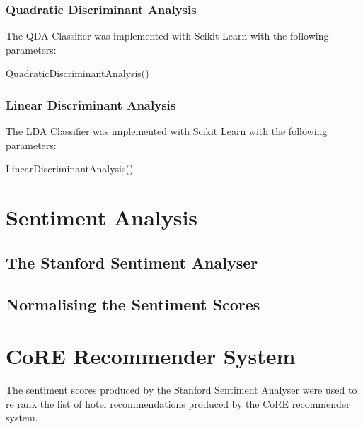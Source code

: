 \subsubsection*{Quadratic Discriminant Analysis}

The QDA Classifier was implemented with Scikit Learn with the following parameters:

\begin{tcolorbox}
\begin{center}
	QuadraticDiscriminantAnalysis()
\end{center}
\end{tcolorbox}

\subsubsection*{Linear Discriminant Analysis}

The LDA Classifier was implemented with Scikit Learn with the following parameters:

\begin{tcolorbox}
\begin{center}
	LinearDiscriminantAnalysis()
\end{center}
\end{tcolorbox}


\section{Sentiment Analysis}

\subsection*{The Stanford Sentiment Analyser}
\subsection*{Normalising the Sentiment Scores}

\section{CoRE Recommender System}

The sentiment scores produced by the Stanford Sentiment Analyser were used to re rank the list of hotel recommendations produced by the CoRE recommender system.

